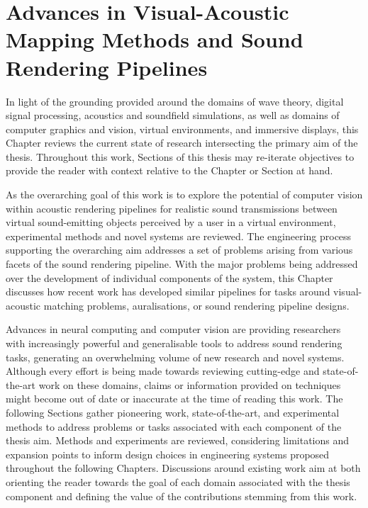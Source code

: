 \chapter{Advances in Visual-Acoustic Mapping Methods and Sound Rendering Pipelines}\label{ch:lit-review}%
In light of the grounding provided around the domains of wave theory, digital signal processing, acoustics and soundfield simulations, as well as domains of computer graphics and vision, virtual environments, and immersive displays, this Chapter reviews the current state of research intersecting the primary aim of the thesis. Throughout this work, Sections of this thesis may re-iterate objectives to provide the reader with context relative to the Chapter or Section at hand.\par
As the overarching goal of this work is to explore the potential of computer vision within acoustic rendering pipelines for realistic sound transmissions between virtual sound-emitting objects perceived by a user in a virtual environment, experimental methods and novel systems are reviewed. The engineering process supporting the overarching aim addresses a set of problems arising from various facets of the sound rendering pipeline. With the major problems being addressed over the development of individual components of the system, this Chapter discusses how recent work has developed similar pipelines for tasks around visual-acoustic matching problems, auralisations, or sound rendering pipeline designs.\par
Advances in neural computing and computer vision are providing researchers with increasingly powerful and generalisable tools to address sound rendering tasks, generating an overwhelming volume of new research and novel systems. Although every effort is being made towards reviewing cutting-edge and state-of-the-art work on these domains, claims or information provided on techniques might become out of date or inaccurate at the time of reading this work. The following Sections gather pioneering work, state-of-the-art, and experimental methods to address problems or tasks associated with each component of the thesis aim. Methods and experiments are reviewed, considering limitations and expansion points to inform design choices in engineering systems proposed throughout the following Chapters. Discussions around existing work aim at both orienting the reader towards the goal of each domain associated with the thesis component and defining the value of the contributions stemming from this work.\par

